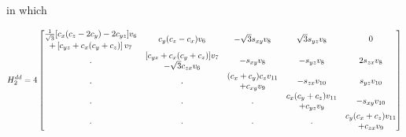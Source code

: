 \documentclass[twocolumn,showpacs,preprintnumbers,superscriptaddress,prb,floatfix,aps,10pt]{revtex4-1}
\begin{document}
in which
\begin{widetext}
\begin{equation}
H_2^{dd} = 4
\begin{bmatrix}
 \tfrac{1}{\sqrt{3}} [c_{x} (c_{z}-2 c_{y})-2 c_{yz}] v_{6} & \multirow{2}{*}{$c_{y} (c_{z}-c_{x}) v_{6}$}    & \multirow{2}{*}{$-\sqrt{3} s_{xy} v_{8}$} & \multirow{2}{*}{$\sqrt{3} s_{yz} v_{8}$} & \multirow{2}{*}{$0$}               \\
             +\left[c_{yz}+c_{x} (c_{y}+c_{z})\right] v_{7} &                                                 &                                           &                                          &                                    \\
\multirow{2}{*}{.}                                          &     [c_{yz}+c_{x} (c_{y}+c_{z})] v_{7}          & \multirow{2}{*}{$-s_{xy} v_{8}$}          & \multirow{2}{*}{$-s_{yz} v_{8}$}         & \multirow{2}{*}{$2 s_{zx} v_{8}$}  \\ 
                                                            &                 -\sqrt{3} c_{zx} v_{6}          &                                           &                                          &                                    \\
\multirow{2}{*}{.}                                          & \multirow{2}{*}{.}                              &      (c_{x}+c_{y}) c_{z} v_{11}           & \multirow{2}{*}{$-s_{zx} v_{10}$}        & \multirow{2}{*}{$ s_{yz} v_{10}$}  \\    
                                                            &                                                 &                  +c_{xy} v_{9}            &                                          &                                    \\
\multirow{2}{*}{.}                                          & \multirow{2}{*}{.}                              & \multirow{2}{*}{.}                        &      c_{x} (c_{y}+c_{z}) v_{11}          & \multirow{2}{*}{$-s_{xy} v_{10}$}  \\
                                                            &                                                 &                                           &                  +c_{yz} v_{9}           &                                    \\
\multirow{2}{*}{.}                                          & \multirow{2}{*}{.}                              & \multirow{2}{*}{.}                        & \multirow{2}{*}{.}                       &      c_{y} (c_{x}+c_{z}) v_{11}    \\
                                                            &                                                 &                                           &                                          &                  +c_{zx} v_{9}     \\
\end{bmatrix}
\end{equation}
\end{widetext}
\end{document}

